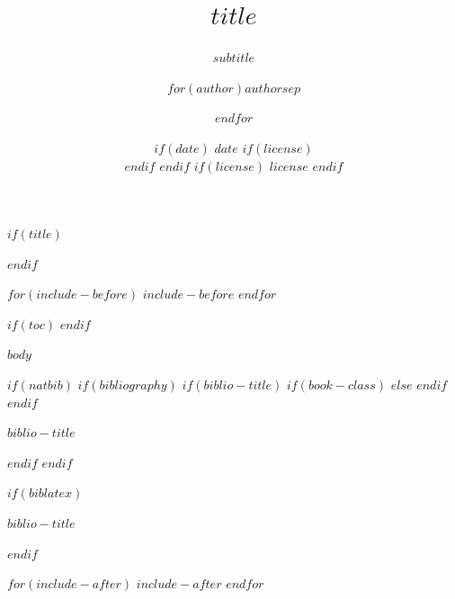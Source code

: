 \documentclass[$if(fontsize)$$fontsize$,$else$14pt,$endif$$if(lang)$$babel-lang$,$endif$$if(handout)$handout,$endif$$if(colorlinks)$dvipsnames,$endif$$if(beamer)$ignorenonframetext,$endif$$for(classoption)$$classoption$$sep$,$endfor$]{$documentclass$}
\title[$shorttitle$]{$title$}
\subtitle{$subtitle$}
\author[
    $if(short-author)$
    $for(short-author)$$short-author$$sep$ \and $endfor$
  $else$
    $for(author)$$author$$sep$ \and $endfor$
  $endif$
  ]{$for(author)$$author$$sep$ \and $endfor$}
\institute[
  $if(short-institute)$
    $for(short-institute)$$short-institute$$sep$ \and $endfor$
  $endif$
  ]{
  $if(department)$
    $for(department)$$department$$sep$ \and $endfor$ \\
  $endif$
  $for(institute)$$institute$$sep$ \and $endfor$
  $if(email)$
    \\ $for(email)$ \href{mailto:$email$}{\nolinkurl{$email$}}$sep$ \and $endfor$
  $endif$
  }
\date[
  $if(short-date)$
    $short-date$
  $else$
    $date$
  $endif$]{
  $if(date)$
    $date$
    $if(license)$
      \\ \vspace{5mm}
    $endif$
  $endif$
  $if(license)$
    {\scriptsize $license$}
  $endif$
}
\newif\ifbibliography
\newcounter{none}  %
\begin{document}
$if(title)$
  \begin{frame}[plain]
  \titlepage
  \end{frame}
$endif$

$for(include-before)$
  $include-before$
$endfor$

$if(toc)$
$endif$

$body$

$if(natbib)$
  $if(bibliography)$
    $if(biblio-title)$
      $if(book-class)$
        \renewcommand\bibname{$biblio-title$}
        $else$
        \renewcommand\refname{$biblio-title$}
      $endif$
    $endif$
    \begin{frame}[allowframebreaks]{$biblio-title$}
    \bibliographytrue
    
    \end{frame}
  $endif$
$endif$

$if(biblatex)$
  \begin{frame}[allowframebreaks]{$biblio-title$}
  \bibliographytrue
  \printbibliography[heading=none]
  \end{frame}
$endif$

$for(include-after)$
  $include-after$
$endfor$
\end{document}
